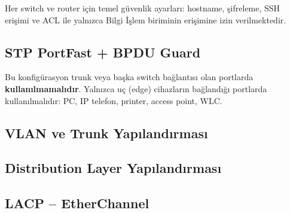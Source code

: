 \documentclass[12pt,a4paper]{article}
\begin{document}
\begin{infobox}[Açıklama]
Her switch ve router için temel güvenlik ayarları: hostname, şifreleme, SSH erişimi ve ACL ile yalnızca Bilgi İşlem biriminin erişimine izin verilmektedir.
\end{infobox}



\subsection{STP PortFast + BPDU Guard}

\begin{warningbox}[Dikkat]
Bu konfigürasyon trunk veya başka switch bağlantısı olan portlarda \textbf{kullanılmamalıdır}. Yalnızca uç (edge) cihazların bağlandığı portlarda kullanılmalıdır: PC, IP telefon, printer, access point, WLC.
\end{warningbox}



\subsection{VLAN ve Trunk Yapılandırması}



\subsection{Distribution Layer Yapılandırması}



\subsection{LACP -- EtherChannel}
\end{document}
